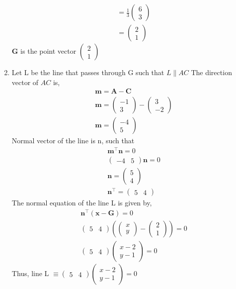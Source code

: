 \documentclass[journal,12pt,twocolumn]{IEEEtran}
\let\vec\mathbf
\newcommand{\myvec}[1]{\ensuremath{\begin{pmatrix}#1\end{pmatrix}}}
\begin{document}
\begin{enumerate}
\begin{align}
        \\
        &=\frac{1}{3}\myvec{6 \\ 3}
        \\
        &= \myvec{2 \\ 1}
    \end{align}
    $\vec{G}$ is the point vector $\myvec{2 \\ 1}$
\item Let L be the line that passes through G such that $L \parallel AC$
    The direction vector of $AC$ is,
    \begin{align}
    &\vec{m} = \vec{A} - \vec{C}
    \\
	&\vec{m} = \myvec{-1 \\ 3} - \myvec{3 \\ -2}
	\\
	&\vec{m} = \myvec{-4 \\ 5}
    \end{align}
    Normal vector of the line is n, such that
    \begin{align}
	&\vec{m}^{\top}\vec{n} = 0
	\\
	&\myvec{-4 & 5}\vec{n} = 0
	\\
	&\vec{n} = \myvec{5 \\ 4}
	\\
	&\vec{n}^{\top} = \myvec{5 & 4}
    \end{align}
    The normal equation of the line L is given by, 
    \begin{align}
	&\vec{n}^{\top}(\vec{x} - \vec{G}) = 0
	\\
	&\myvec{5 & 4}(\myvec{x \\ y} - \myvec{2 \\ 1})= 0
	\\
	&\myvec{5 & 4}\myvec{x - 2 \\ y - 1} = 0
    \end{align}
    Thus, line L $\equiv \myvec{5 & 4}\myvec{x - 2 \\ y - 1} = 0$
\end{enumerate}
\end{document}
